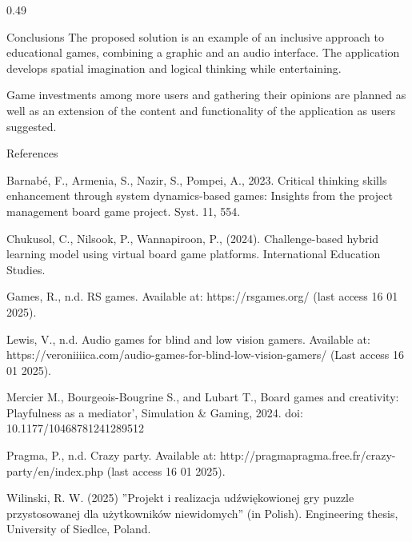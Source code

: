 \documentclass[final]{beamer}
\begin{document}
\begin{frame}[t]
\begin{columns}[t,totalwidth=\textwidth]
\begin{column}{0.49\textwidth}
\begin{block}{Conclusions}
The proposed solution is an example of an inclusive approach to educational games, combining a graphic and an audio interface. The application develops spatial imagination and logical thinking while entertaining. 

Game investments among more users and gathering their opinions are planned as well as an extension of the content and functionality of the application as users suggested.
\end{block}

\begin{block}{References} 
\footnotesize {

Barnabé, F., Armenia, S., Nazir, S., Pompei, A., 2023. Critical thinking skills enhancement through system dynamics-based games: Insights from the project management board game project. Syst. 11, 554.

Chukusol, C., Nilsook, P., Wannapiroon, P., (2024). Challenge-based hybrid learning model using virtual board game platforms. International Education Studies.

Games, R., n.d. RS games. Available at: https://rsgames.org/ (last access 16 01 2025).

Lewis, V., n.d. Audio games for blind and low vision gamers. Available at: https://veroniiiica.com/audio-games-for-blind-low-vision-gamers/ (Last access 16 01 2025).

Mercier M., Bourgeois-Bougrine S., and Lubart T., Board games and creativity: Playfulness as a mediator’, Simulation \& Gaming, 2024. doi: 10.1177/10468781241289512

Pragma, P., n.d. Crazy party. Available at: http://pragmapragma.free.fr/crazy-party/en/index.php (last access 16 01 2025).

Wilinski, R. W. (2025) ''Projekt i realizacja udźwiękowionej gry puzzle przystosowanej dla użytkowników niewidomych'' (in Polish). Engineering thesis, University of Siedlce, Poland.}
\end{block}

\end{column}
\end{columns}
\end{frame}
\end{document}
